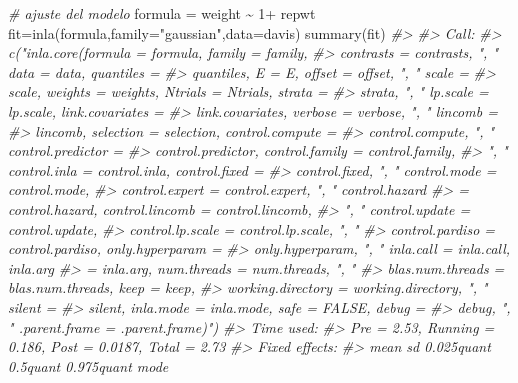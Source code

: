 \documentclass[
]{book}
\newenvironment{Shaded}{\begin{snugshade}}{\end{snugshade}}
\newcommand{\AttributeTok}[1]{\textcolor[rgb]{0.77,0.63,0.00}{#1}}
\newcommand{\CommentTok}[1]{\textcolor[rgb]{0.56,0.35,0.01}{\textit{#1}}}
\newcommand{\DecValTok}[1]{\textcolor[rgb]{0.00,0.00,0.81}{#1}}
\newcommand{\FunctionTok}[1]{\textcolor[rgb]{0.00,0.00,0.00}{#1}}
\newcommand{\NormalTok}[1]{#1}
\newcommand{\OtherTok}[1]{\textcolor[rgb]{0.56,0.35,0.01}{#1}}
\newcommand{\SpecialCharTok}[1]{\textcolor[rgb]{0.00,0.00,0.00}{#1}}
\newcommand{\StringTok}[1]{\textcolor[rgb]{0.31,0.60,0.02}{#1}}
\begin{document}
\begin{Shaded}
\begin{Highlighting}[]
\CommentTok{\# ajuste del modelo }
\NormalTok{formula }\OtherTok{=}\NormalTok{ weight }\SpecialCharTok{\textasciitilde{}} \DecValTok{1}\SpecialCharTok{+}\NormalTok{ repwt}
\NormalTok{fit}\OtherTok{=}\FunctionTok{inla}\NormalTok{(formula,}\AttributeTok{family=}\StringTok{"gaussian"}\NormalTok{,}\AttributeTok{data=}\NormalTok{davis)}
\FunctionTok{summary}\NormalTok{(fit)}
\CommentTok{\#\textgreater{} }
\CommentTok{\#\textgreater{} Call:}
\CommentTok{\#\textgreater{}    c("inla.core(formula = formula, family = family, }
\CommentTok{\#\textgreater{}    contrasts = contrasts, ", " data = data, quantiles = }
\CommentTok{\#\textgreater{}    quantiles, E = E, offset = offset, ", " scale = }
\CommentTok{\#\textgreater{}    scale, weights = weights, Ntrials = Ntrials, strata = }
\CommentTok{\#\textgreater{}    strata, ", " lp.scale = lp.scale, link.covariates = }
\CommentTok{\#\textgreater{}    link.covariates, verbose = verbose, ", " lincomb = }
\CommentTok{\#\textgreater{}    lincomb, selection = selection, control.compute = }
\CommentTok{\#\textgreater{}    control.compute, ", " control.predictor = }
\CommentTok{\#\textgreater{}    control.predictor, control.family = control.family, }
\CommentTok{\#\textgreater{}    ", " control.inla = control.inla, control.fixed = }
\CommentTok{\#\textgreater{}    control.fixed, ", " control.mode = control.mode, }
\CommentTok{\#\textgreater{}    control.expert = control.expert, ", " control.hazard }
\CommentTok{\#\textgreater{}    = control.hazard, control.lincomb = control.lincomb, }
\CommentTok{\#\textgreater{}    ", " control.update = control.update, }
\CommentTok{\#\textgreater{}    control.lp.scale = control.lp.scale, ", " }
\CommentTok{\#\textgreater{}    control.pardiso = control.pardiso, only.hyperparam = }
\CommentTok{\#\textgreater{}    only.hyperparam, ", " inla.call = inla.call, inla.arg }
\CommentTok{\#\textgreater{}    = inla.arg, num.threads = num.threads, ", " }
\CommentTok{\#\textgreater{}    blas.num.threads = blas.num.threads, keep = keep, }
\CommentTok{\#\textgreater{}    working.directory = working.directory, ", " silent = }
\CommentTok{\#\textgreater{}    silent, inla.mode = inla.mode, safe = FALSE, debug = }
\CommentTok{\#\textgreater{}    debug, ", " .parent.frame = .parent.frame)") }
\CommentTok{\#\textgreater{} Time used:}
\CommentTok{\#\textgreater{}     Pre = 2.53, Running = 0.186, Post = 0.0187, Total = 2.73 }
\CommentTok{\#\textgreater{} Fixed effects:}
\CommentTok{\#\textgreater{}              mean    sd 0.025quant 0.5quant 0.975quant mode}

\end{Highlighting}
\end{Shaded}
\end{document}

